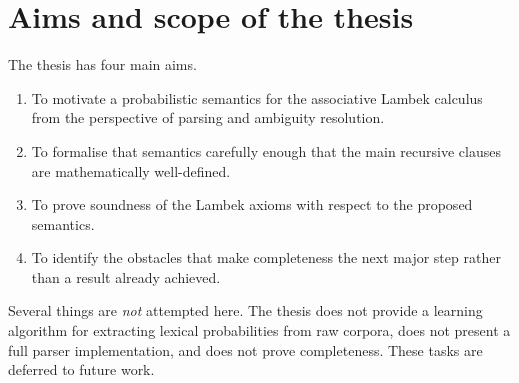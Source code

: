 \section{Aims and scope of the thesis}
The thesis has four main aims.
\begin{enumerate}[label=(\roman*)]
    \item To motivate a probabilistic semantics for the associative Lambek calculus from the
    perspective of parsing and ambiguity resolution.
    \item To formalise that semantics carefully enough that the main recursive clauses are
    mathematically well-defined.
    \item To prove soundness of the Lambek axioms with respect to the proposed semantics.
    \item To identify the obstacles that make completeness the next major step rather than a result
    already achieved.
\end{enumerate}

Several things are \emph{not} attempted here. The thesis does not provide a learning algorithm for
extracting lexical probabilities from raw corpora, does not present a full parser implementation,
and does not prove completeness. These tasks are deferred to future work.

